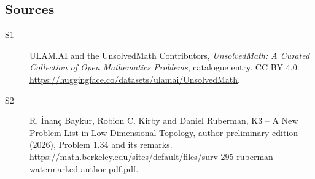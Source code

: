 \documentclass[11pt]{article}
\begin{document}
\subsection{Sources}
\begin{description}
\item[\hypertarget{source:statement:1}{S1}] ULAM.AI and the UnsolvedMath Contributors, \emph{UnsolvedMath: A Curated Collection of Open Mathematics Problems}, catalogue entry. CC BY 4.0. \url{https://huggingface.co/datasets/ulamai/UnsolvedMath}.
\item[\hypertarget{source:statement:2}{S2}] R. \.{I}nan\c{c} Baykur, Robion C. Kirby and Daniel Ruberman, K3 -- A New Problem List in Low-Dimensional Topology, author preliminary edition (2026), Problem 1.34 and its remarks. \url{https://math.berkeley.edu/sites/default/files/surv-295-ruberman-watermarked-author-pdf.pdf}.
\end{description}
\label{end:statement}
\end{document}
